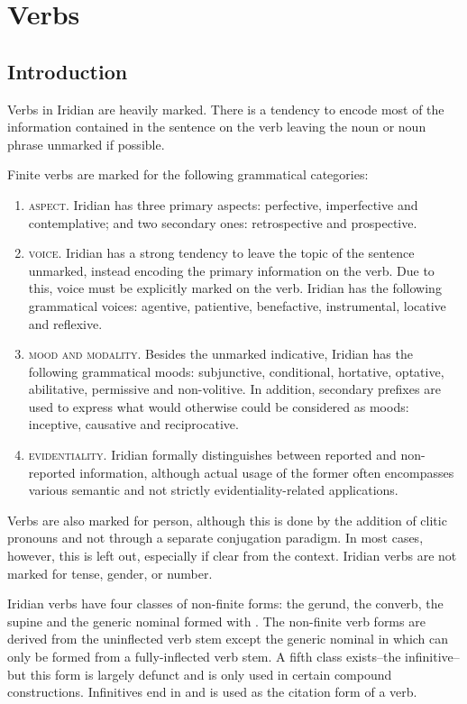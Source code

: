 \chapter{Verbs}

\section{Introduction}


Verbs in Iridian are heavily marked. There is a tendency to encode most of the
information contained in the sentence on the verb leaving the noun or noun
phrase unmarked if possible. 

Finite verbs are marked for the following grammatical
categories:
\begin{enumerate}
	\item {\scshape aspect}. Iridian has three primary aspects:
	perfective, imperfective and contemplative; and two secondary ones:
	retrospective and prospective.
	\item {\scshape voice}. Iridian has a strong tendency to leave
	the topic of the sentence unmarked, instead encoding the primary information
	on the verb. Due to this, voice must be explicitly marked on the verb.
	Iridian has the following grammatical voices: agentive, patientive,
	benefactive, instrumental, locative and reflexive.
	\item {\scshape mood and modality}. Besides the unmarked
	indicative, Iridian has the following grammatical moods: subjunctive,
	conditional, hortative, optative, abilitative, permissive and non-volitive.
	In addition, secondary prefixes are used to express what would otherwise
	could be considered as moods: inceptive, causative and reciprocative.
	\item {\scshape evidentiality}. Iridian formally
	distinguishes between reported and non-reported information, although actual
	usage of the former often encompasses various semantic and not strictly
	evidentiality-related applications.
\end{enumerate}

Verbs are also marked for person, although this is done by the addition of
clitic pronouns and not through a separate conjugation paradigm. In most cases,
however, this is left out, especially if clear from the context. Iridian verbs
are not marked for tense, gender, or number.

Iridian verbs have four classes of non-finite forms: the gerund, the converb,
the supine and the generic nominal formed with . The non-finite verb
forms are derived from the uninflected verb stem except the generic nominal in
 which can only be formed from a fully-inflected verb stem. A fifth
class exists--the infinitive--but this form is largely defunct and is only used
in certain compound constructions. Infinitives end in  and is used as
the citation form of a verb.

